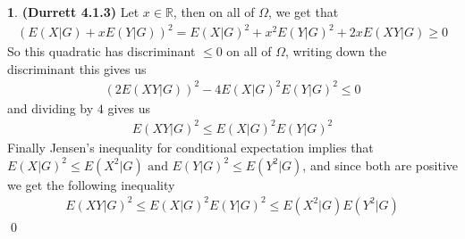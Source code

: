 \documentclass{article}
\theoremstyle{definition}
\newtheorem{pb}{}
\newcommand{\set}[1]{\left\{#1\right\}}
\newcommand{\tand}{\text{ and }}
\begin{document}
    \begin{pb} \textbf{(Durrett 4.1.3)}
        Let \(x \in \mathbb{R}\), then on all of \(\Omega\), we get that
        \begin{align*}
            (E(X|G) + xE(Y|G))^2 = E(X|G)^2 + x^2E(Y|G)^2 + 2xE(XY|G) \geq 0
        \end{align*}
        So this quadratic has discriminant \(\leq 0\) on all of \(\Omega\), writing down the discriminant this gives us
        \begin{align*}
            (2E(XY|G))^2 - 4E(X|G)^2E(Y|G)^2 \leq 0
        \end{align*}
        and dividing by \(4\) gives us
        \begin{align*}
            E(XY|G)^2 \leq E(X|G)^2E(Y|G)^2
        \end{align*}
        Finally Jensen's inequality for conditional expectation implies that \(E(X|G)^2 \leq E(X^2|G) \tand E(Y|G)^2 \leq E(Y^2|G)\), and since both are positive we get the following inequality
        \begin{align*}
            E(XY|G)^2 \leq E(X|G)^2E(Y|G)^2 \leq E(X^2|G)E(Y^2|G)
        \end{align*} \qed

    \end{pb}
\end{document}

